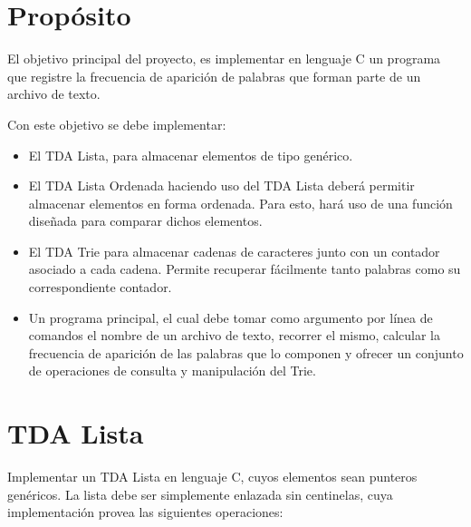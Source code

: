 \documentclass[12pt,a4paper]{article}
\begin{document}

\section*{Propósito}
El objetivo principal del proyecto, es implementar en lenguaje C un programa que registre la frecuencia de aparición de palabras que forman parte de un archivo de texto. 

Con este objetivo se debe implementar:
\begin{itemize}
	
	\item El TDA Lista, para almacenar elementos de tipo genérico.
	
	\item El TDA Lista Ordenada haciendo uso del TDA Lista deberá permitir almacenar elementos en forma ordenada. Para esto, hará uso de una función diseñada para comparar dichos elementos.
	
	\item El TDA Trie para almacenar cadenas de caracteres junto con un contador asociado a cada cadena. Permite recuperar fácilmente tanto palabras como su correspondiente contador. 
	
	\item Un programa principal, el cual debe tomar como argumento por línea de comandos el nombre de un archivo de texto, recorrer el mismo, calcular la frecuencia de aparición de las palabras que lo componen y ofrecer un conjunto de operaciones de consulta y manipulación del Trie.
	
\end{itemize}

\section{TDA Lista}
Implementar un TDA Lista en lenguaje C, cuyos elementos sean punteros genéricos. La lista debe ser simplemente enlazada sin centinelas, cuya implementación provea las siguientes operaciones:
\end{document}
